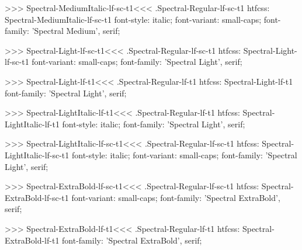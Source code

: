 >>>
\<Spectral-MediumItalic-lf-sc-t1\><<<
.Spectral-Regular-lf-sc-t1
htfcss:  Spectral-MediumItalic-lf-sc-t1  font-style: italic; font-variant: small-caps; font-family: 'Spectral Medium', serif;

>>>
\<Spectral-Light-lf-sc-t1\><<<
.Spectral-Regular-lf-sc-t1
htfcss:  Spectral-Light-lf-sc-t1  font-variant: small-caps; font-family: 'Spectral Light', serif;

>>>
\<Spectral-Light-lf-t1\><<<
.Spectral-Regular-lf-t1
htfcss:  Spectral-Light-lf-t1  font-family: 'Spectral Light', serif;

>>>
\<Spectral-LightItalic-lf-t1\><<<
.Spectral-Regular-lf-t1
htfcss:  Spectral-LightItalic-lf-t1  font-style: italic; font-family: 'Spectral Light', serif;

>>>
\<Spectral-LightItalic-lf-sc-t1\><<<
.Spectral-Regular-lf-sc-t1
htfcss:  Spectral-LightItalic-lf-sc-t1  font-style: italic; font-variant: small-caps; font-family: 'Spectral Light', serif;

>>>
\<Spectral-ExtraBold-lf-sc-t1\><<<
.Spectral-Regular-lf-sc-t1
htfcss:  Spectral-ExtraBold-lf-sc-t1  font-variant: small-caps; font-family: 'Spectral ExtraBold', serif;

>>>
\<Spectral-ExtraBold-lf-t1\><<<
.Spectral-Regular-lf-t1
htfcss:  Spectral-ExtraBold-lf-t1  font-family: 'Spectral ExtraBold', serif;

